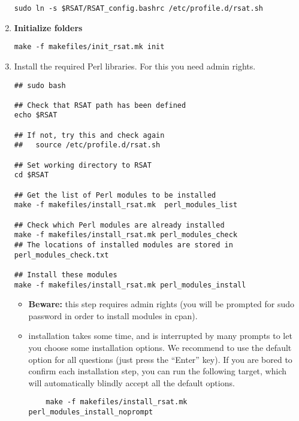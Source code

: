 \documentclass[12pt,a4paper, oneside]{scrreprt} %
\begin{document}
\begin{enumerate}
\begin{verbatim}
sudo ln -s $RSAT/RSAT_config.bashrc /etc/profile.d/rsat.sh
\end{verbatim}

\item \textbf{Initialize \RSAT folders}

  \begin{lstlisting}
make -f makefiles/init_rsat.mk init
  \end{lstlisting}
  
\item Install the required Perl libraries. For this you need admin
  rights.

  \begin{lstlisting}
## sudo bash

## Check that RSAT path has been defined
echo $RSAT

## If not, try this and check again
##   source /etc/profile.d/rsat.sh

## Set working directory to RSAT
cd $RSAT

## Get the list of Perl modules to be installed
make -f makefiles/install_rsat.mk  perl_modules_list

## Check which Perl modules are already installed
make -f makefiles/install_rsat.mk perl_modules_check
## The locations of installed modules are stored in perl_modules_check.txt

## Install these modules
make -f makefiles/install_rsat.mk perl_modules_install
  \end{lstlisting}


  \begin{itemize}
  \item \textbf{Beware: } this step requires admin rights (you will be
    prompted for sudo password in order to install modules in cpan).
    
  \item {} installation takes some time, and is
    interrupted by many prompts to let you choose some installation
    options. We recommend to use the default option for all questions
    (just press the ``Enter'' key). If you are bored to confirm each
    installation step, you can run the following target, which will
    automatically blindly accept all the default options.

\begin{lstlisting}
    make -f makefiles/install_rsat.mk perl_modules_install_noprompt
\end{lstlisting}
    

\end{itemize}
\end{enumerate}
\end{document}
